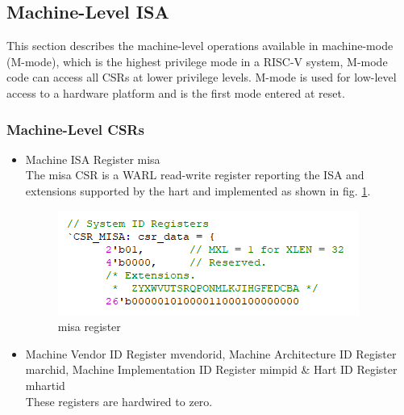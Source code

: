 \documentclass[../main.tex]{subfiles}
\begin{document}
\subsection{Machine-Level ISA}
This section describes the machine-level operations available in machine-mode (M-mode), which is the highest privilege mode in a RISC-V system, M-mode code can access all CSRs
at lower privilege levels. M-mode is used for low-level access to a hardware platform and is the first mode entered at reset.\\

\subsubsection{Machine-Level CSRs}
\begin{itemize}
    \item Machine ISA Register misa\\
        The misa CSR is a WARL read-write register reporting the ISA and extensions supported by the hart and implemented as shown in fig. \ref{fig:misa}.
        \begin{figure}[h]
            \centering
                \includegraphics[width=10 cm]{diagrams/misa.png}
                \caption{misa register}
                \label{fig:misa}
        \end{figure}
    
    \item Machine Vendor ID Register mvendorid, Machine Architecture ID Register marchid, Machine Implementation ID Register mimpid & Hart ID Register mhartid\\
        These registers are hardwired to zero.\\


\end{itemize}
\end{document}
